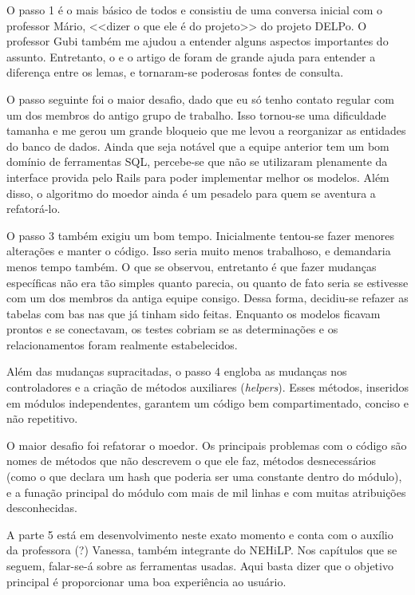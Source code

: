 O passo 1 é o mais básico de todos e consistiu de uma conversa inicial com o professor Mário,
<<dizer o que ele é do projeto>> do projeto DELPo. O professor Gubi também me ajudou a entender
alguns aspectos importantes do assunto. Entretanto, o  e o artigo de \cite{Mar:17}
foram de grande ajuda para entender a diferença entre os lemas, e tornaram-se poderosas fontes
de consulta.

O passo seguinte foi o maior desafio, dado que eu só tenho contato regular com um dos membros
do antigo grupo de trabalho. Isso tornou-se uma dificuldade tamanha e me gerou um grande bloqueio
que me levou a reorganizar as entidades do banco de dados. Ainda que seja notável que a equipe
anterior tem um bom domínio de ferramentas SQL, percebe-se que não se utilizaram plenamente da
interface provida pelo Rails para poder implementar melhor os modelos. Além disso, o algoritmo
do moedor ainda é um pesadelo para quem se aventura a refatorá-lo.

O passo 3 também exigiu um bom tempo. Inicialmente tentou-se fazer menores alterações e manter
o código. Isso seria muito menos trabalhoso, e demandaria menos tempo também. O que se observou,
entretanto é que fazer mudanças específicas não era tão simples quanto parecia, ou quanto de fato
seria se estivesse com um dos membros da antiga equipe consigo. Dessa forma, decidiu-se refazer as
tabelas com bas nas que já tinham sido feitas. Enquanto os modelos ficavam prontos e se conectavam,
os testes cobriam se as determinações e os relacionamentos foram realmente estabelecidos.

Além das mudanças supracitadas, o passo 4 engloba as mudanças nos controladores e a criação de métodos
auxiliares (\emph{helpers}). Esses métodos, inseridos em módulos independentes, garantem um código bem
compartimentado, conciso e não repetitivo.

O maior desafio foi refatorar o moedor. Os principais problemas com o código são nomes de métodos que
não descrevem o que ele faz, métodos desnecessários (como o que declara um hash que poderia ser uma
constante dentro do módulo), e a funação principal do módulo com mais de mil linhas e com muitas
atribuições desconhecidas.

A parte 5 está em desenvolvimento neste exato momento e conta com o auxílio da professora (?) Vanessa,
também integrante do NEHiLP. Nos capítulos que se seguem, falar-se-á sobre as ferramentas usadas.
Aqui basta dizer que o objetivo principal é proporcionar uma boa experiência ao usuário.

